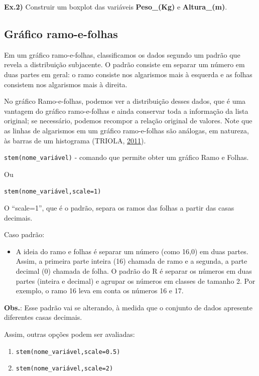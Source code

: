\documentclass[12pt,brazil,]{book}
\providecommand{\tightlist}{%
  \setlength{\itemsep}{0pt}\setlength{\parskip}{0pt}}
\begin{document}
\textbf{Ex.2)} Construir um boxplot das variáveis \textbf{Peso\_(Kg)} e
\textbf{Altura\_(m)}.

\hypertarget{grafico-ramo-e-folhas}{%
\subsection{Gráfico ramo-e-folhas}\label{grafico-ramo-e-folhas}}

Em um gráfico ramo-e-folhas, classificamos os dados segundo um padrão
que revela a distribuição subjacente. O padrão consiste em separar um
número em duas partes em geral: o ramo consiste nos algarismos mais à
esquerda e as folhas consistem nos algarismos mais à direita.

No gráfico Ramo-e-folhas, podemos ver a distribuição desses dados, que é
uma vantagem do gráfico ramo-e-folhas e ainda conservar toda a
informação da lista original; se necessário, podemos recompor a relação
original de valores. Note que as linhas de algarismos em um gráfico
ramo-e-folhas são análogas, em natureza, às barras de um histograma
(TRIOLA, \protect\hyperlink{ref-triola1999}{2011}).

\texttt{stem(nome\_variável)} - comando que permite obter um gráfico
Ramo e Folhas.

Ou

\texttt{stem(nome\_variável,scale=1)}

O ``scale=1'', que é o padrão, separa os ramos das folhas a partir das
casas decimais.

Caso padrão:

\begin{itemize}
\tightlist
\item
  A ideia do ramo e folhas é separar um número (como 16,0) em duas
  partes. Assim, a primeira parte inteira (16) chamada de ramo e a
  segunda, a parte decimal (0) chamada de folha. O padrão do R é separar
  os números em duas partes (inteira e decimal) e agrupar os números em
  classes de tamanho 2. Por exemplo, o ramo 16 leva em conta os números
  16 e 17.
\end{itemize}

\textbf{Obs.}: Esse padrão vai se alterando, à medida que o conjunto de
dados apresente diferentes casas decimais.

Assim, outras opções podem ser avaliadas:

\begin{enumerate}
\def\labelenumi{\alph{enumi})}
\item
  \texttt{stem(nome\_variável,scale=0.5)}
\item
  \texttt{stem(nome\_variável,scale=2)}
\end{enumerate}
\end{document}
